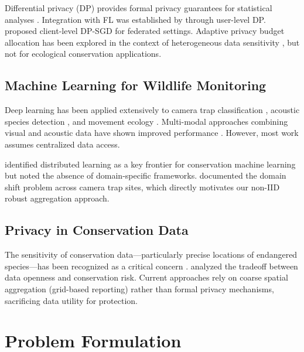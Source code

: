 \documentclass[11pt,a4paper]{article}
\begin{document}
Differential privacy (DP) provides formal privacy guarantees for statistical analyses \citep{dwork2014algorithmic}.
Integration with FL was established by \citet{mcmahan2018learning} through user-level DP.
\citet{geyer2017differentially} proposed client-level DP-SGD for federated settings.
Adaptive privacy budget allocation has been explored in the context of heterogeneous data sensitivity \citep{kang2020incentive}, but not for ecological conservation applications.

\subsection{Machine Learning for Wildlife Monitoring}

Deep learning has been applied extensively to camera trap classification \citep{norouzzadeh2018automatically, beery2019efficient}, acoustic species detection \citep{kahl2021birdnet, stowell2019automatic}, and movement ecology \citep{patterson2017statistical}.
Multi-modal approaches combining visual and acoustic data have shown improved performance \citep{verma2022towards}.
However, most work assumes centralized data access.

\citet{tuia2022perspectives} identified distributed learning as a key frontier for conservation machine learning but noted the absence of domain-specific frameworks.
\citet{beery2021iwildcam} documented the domain shift problem across camera trap sites, which directly motivates our non-IID robust aggregation approach.

\subsection{Privacy in Conservation Data}

The sensitivity of conservation data---particularly precise locations of endangered species---has been recognized as a critical concern \citep{lindenmayer2017do}.
\citet{tulloch2018decision} analyzed the tradeoff between data openness and conservation risk.
Current approaches rely on coarse spatial aggregation (grid-based reporting) rather than formal privacy mechanisms, sacrificing data utility for protection.

\section{Problem Formulation}
\label{sec:formulation}
\end{document}
